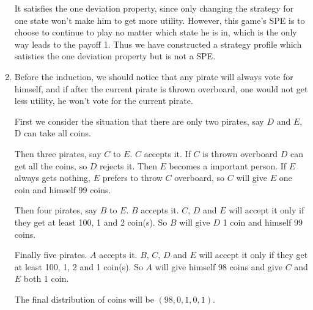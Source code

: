 \documentclass[12pt]{cgtmd}
\begin{document}
\begin{enumerate}
        It satisfies the one deviation property, since only changing the strategy for one state won't make him to get more utility. However, this game's SPE is to choose to continue to play no matter which state he is in, which is the only way leads to the payoff 1. Thus we have constructed a strategy profile which satisties the one deviation property but is not a SPE. 
    \item Before the induction, we should notice that any pirate will always vote for himself, and if after the current pirate is thrown overboard, one would not get less utility, he won't vote for the current pirate.

        First we consider the situation that there are only two pirates, say $D$ and $E$, D can take all coins.

        Then three pirates, say $C$ to $E$. $C$ accepts it. If $C$ is thrown overboard $D$ can get all the coins, so $D$ rejects it. Then $E$ becomes a important person. If $E$ always gets nothing, $E$ prefers to throw $C$ overboard, so $C$ will give $E$ one coin and himself 99 coins.

        Then four pirates, say $B$ to $E$. $B$ accepts it. $C$, $D$ and $E$ will accept it only if they get at least 100, 1 and 2 coin(s). So $B$ will give $D$ 1 coin and himself 99 coins.

        Finally five pirates. $A$ accepts it. $B$, $C$, $D$ and $E$ will accept it only if they get at least 100, 1, 2 and 1 coin(s). So $A$ will give himself 98 coins and give $C$ and $E$ both 1 coin.

        The final distribution of coins will be $(98, 0, 1, 0, 1)$.

\end{enumerate}
\end{document}
